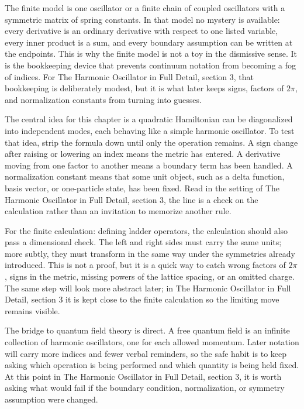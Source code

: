The finite model is one oscillator or a finite chain of coupled oscillators with a symmetric matrix of spring constants.  In that model no mystery is available: every derivative is an ordinary derivative with respect to one listed variable, every inner product is a sum, and every boundary assumption can be written at the endpoints.  This is why the finite model is not a toy in the dismissive sense.  It is the bookkeeping device that prevents continuum notation from becoming a fog of indices.  For The Harmonic Oscillator in Full Detail, section 3, that bookkeeping is deliberately modest, but it is what later keeps signs, factors of \(2\pi\), and normalization constants from turning into guesses.

The central idea for this chapter is a quadratic Hamiltonian can be diagonalized into independent modes, each behaving like a simple harmonic oscillator.  To test that idea, strip the formula down until only the operation remains.  A sign change after raising or lowering an index means the metric has entered.  A derivative moving from one factor to another means a boundary term has been handled.  A normalization constant means that some unit object, such as a delta function, basis vector, or one-particle state, has been fixed.  Read in the setting of The Harmonic Oscillator in Full Detail, section 3, the line is a check on the calculation rather than an invitation to memorize another rule.

For the finite calculation: defining ladder operators, the calculation should also pass a dimensional check.  The left and right sides must carry the same units; more subtly, they must transform in the same way under the symmetries already introduced.  This is not a proof, but it is a quick way to catch wrong factors of \(2\pi\), signs in the metric, missing powers of the lattice spacing, or an omitted charge.  The same step will look more abstract later; in The Harmonic Oscillator in Full Detail, section 3 it is kept close to the finite calculation so the limiting move remains visible.

The bridge to quantum field theory is direct.  A free quantum field is an infinite collection of harmonic oscillators, one for each allowed momentum.  Later notation will carry more indices and fewer verbal reminders, so the safe habit is to keep asking which operation is being performed and which quantity is being held fixed.  At this point in The Harmonic Oscillator in Full Detail, section 3, it is worth asking what would fail if the boundary condition, normalization, or symmetry assumption were changed.

